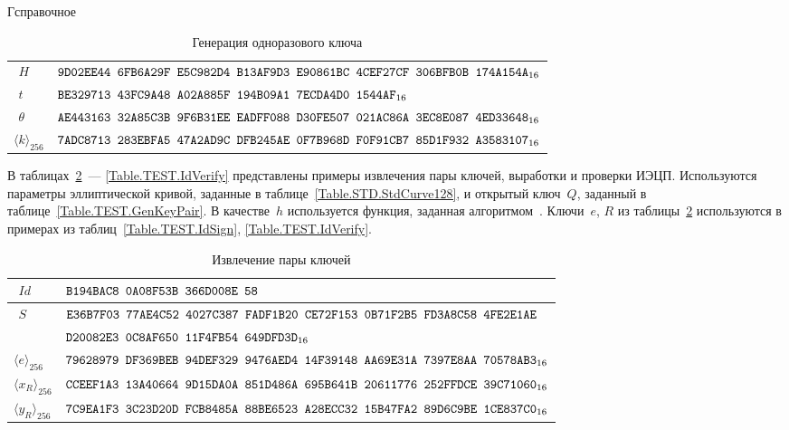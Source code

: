 \begin{appendix}{Г}{справочное}
\begin{table}[!h]
\caption{Генерация одноразового ключа}
\label{Table.TEST.GENK1}
{\small
\begin{tabular}{|l|l|}
%
\hline
$\phantom{\langle}H$ & 
$\texttt{9D02EE44~6FB6A29F~E5C982D4~B13AF9D3~E90861BC~4CEF27CF~306BFB0B~174A154A}_{16}$\\
%
\dhline
$\phantom{\langle}t$ & 
$\texttt{BE329713~43FC9A48~A02A885F~194B09A1~7ECDA4D0~1544AF}_{16}$\\
%
\hline
$\phantom{\langle}\theta$ & 
$\texttt{AE443163~32A85C3B~9F6B31EE~EADFF088~D30FE507~021AC86A~3EC8E087~4ED33648}_{16}$\\
%
\dhline
$\langle k\rangle_{256}$ & 
%
$\texttt{7ADC8713~283EBFA5~47A2AD9C~DFB245AE~0F7B968D~F0F91CB7~85D1F932~A3583107}_{16}$\\
\hline
\end{tabular}
}
\end{table}

\label{TEST.IBS}

В таблицах~\ref{Table.TEST.IdExtract}~--- \ref{Table.TEST.IdVerify} 
представлены примеры извлечения пары ключей, выработки и проверки 
ИЭЦП.
%
Используются параметры эллиптической кривой, 
заданные в таблице~\ref{Table.STD.StdCurve128},
и открытый ключ~$Q$, 
заданный в таблице~\ref{Table.TEST.GenKeyPair}.
%
В качестве~$h$ используется функция,
заданная алгоритмом~.
%
Ключи~$e$, $R$ из таблицы~\ref{Table.TEST.IdExtract}
используются в примерах из таблиц~\ref{Table.TEST.IdSign}, 
\ref{Table.TEST.IdVerify}.

\clearpage

\begin{table}[!h]
\caption{Извлечение пары ключей}\label{Table.TEST.IdExtract}
{\small
\begin{tabular}{|l|l|}
\hline
$\phantom{\langle}Id$ & 
$\texttt{B194BAC8~0A08F53B~366D008E~58}$\\
%
\hline
$\phantom{\langle}S$ & 
$\texttt{E36B7F03~77AE4C52~4027C387~FADF1B20~CE72F153~0B71F2B5~FD3A8C58~4FE2E1AE}$\\
& 
$\texttt{D20082E3~0C8AF650~11F4FB54~649DFD3D}_{16}$\\
%
\dhline
$\langle e\rangle_{256}$ & 
$\texttt{79628979~DF369BEB~94DEF329~9476AED4~14F39148~AA69E31A~7397E8AA~70578AB3}_{16}$\\
%
\hline
$\langle x_R\rangle_{256}$ & 
$\texttt{CCEEF1A3~13A40664~9D15DA0A~851D486A~695B641B~20611776~252FFDCE~39C71060}_{16}$\\
%
\hline
$\langle y_R\rangle_{256}$ & 
$\texttt{7C9EA1F3~3C23D20D~FCB8485A~88BE6523~A28ECC32~15B47FA2~89D6C9BE~1CE837C0}_{16}$\\
\hline
\end{tabular}
}
\end{table}


\end{appendix}
